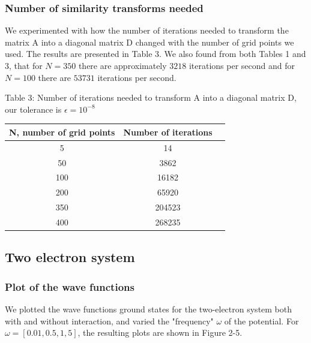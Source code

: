 \documentclass[norsk,a4paper,12pt]{article}
\begin{document}
\subsubsection{Number of similarity transforms needed}
\par
\vspace{2mm}

We experimented with how the number of iterations needed to transform the matrix A into a diagonal matrix D changed with the number of grid points we used. The results are presented in Table 3. We also found from both Tables 1 and 3, that for $N=350$ there are approximately $3218$ iterations per second and for $N=100$ there are $53731$ iterations per second.
\par
\vspace{3mm}


Table 3: Number of iterations needed to transform A into a diagonal matrix D, our tolerance is $\epsilon = 10^{-8}$
\par
\vspace{3mm}
\begin{tabular}{|c|c|c|}\hline
     {\bf N, number of grid points} & {\bf Number of iterations}\\ \hline
     5 & 14\\
     50 & 3862\\
     100 & 16182\\
     200 & 65920\\
     350 & 204523 \\ 
     400 & 268235\\\hline
\end{tabular}\par
  

\par
\vspace{5mm}

\subsection{Two electron system}
\par
\vspace{3mm}

\subsubsection{Plot of the wave functions}
\par
\vspace{3mm}

We plotted the wave functions ground states for the two-electron system both with and without interaction, and varied the "frequency" $\omega$ of the potential. For $\omega = [0.01, 0.5, 1, 5]$, the resulting plots are shown in Figure 2-5. 
\par
\vspace{3mm}
\end{document}
